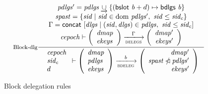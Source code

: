 \begin{figure}
  \begin{equation}
    \label{eq:rule:block-delegation}
    \inference[Block-dlg]
    {
      \var{pdlgs'} = \var{pdlgs} \unionoverride \{(\bslot{b} + d) \mapsto \bdlgs{b} \}\\
      \var{spast} = \{ \var{sid} \mid \var{sid} \in \var \dom ~ \var{pdlgs'}
                                    ,~ \var{sid} \leq \var{sid_c}\}\\
      \Gamma = \fun{concat}~ [ \var{dlgs} \mid (\var{sid}, \var{dlgs}) \in \var{pdlgs}
                                          ,~ \var{sid} \leq \var{sid_c}]\\
      \var{cepoch} \vdash
      {
        \left(
          \begin{array}{l}
            \var{dmap}\\
            \var{ekeys}
          \end{array}
        \right)
      }
      \trans{delegs}{\Gamma}
      {
        \left(
          \begin{array}{r}
            \var{dmap'}\\
            \var{ekeys'}
          \end{array}
        \right)
      }
    }
    {
      \begin{array}{l}
        \var{cepoch}\\
        \var{sid_c}\\
        d
      \end{array}
      \vdash
      {
        \left(
          \begin{array}{l}
            \var{dmap}\\
            \var{pdlgs}\\
            \var{ekeys}
          \end{array}
        \right)
      }
      \trans{bdeleg}{b}
      {
        \left(
          \begin{array}{r}
            \var{dmap'}\\
            \var{\var{spast} \subtractdom pdlgs'}\\
            \var{ekeys'}
          \end{array}
        \right)
      }
    }
  \end{equation}
  \caption{Block delegation rules}
  \label{fig:rules:block-delegation}
\end{figure}

